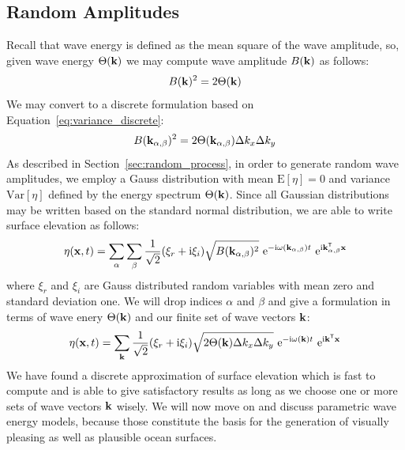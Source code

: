 \subsection{Random Amplitudes}
\label{sec:random_amplitudes}
Recall that wave energy is defined as the mean square of the wave amplitude, so,
given wave energy $\Theta(\mathbf{k})$ we may compute wave amplitude 
$B(\mathbf{k})$ as follows:
\begin{equation}
 B(\mathbf{k})^2 = 2\Theta(\mathbf{k})
\end{equation}
We may convert to a discrete formulation based on 
Equation~\ref{eq:variance_discrete}:
\begin{equation}
 B(\mathbf{k}_{\alpha,\beta})^2 = 2\Theta(\mathbf{k}_{\alpha,\beta})\Delta k_x 
\Delta k_y
\end{equation}
As described in Section~\ref{sec:random_process}, in order to generate random 
wave amplitudes, we employ a Gauss distribution with mean $\mathrm{E}[\eta] 
= 0$ and variance $\mathrm{Var}[\eta]$ defined by the energy spectrum
$\Theta(\mathbf{k})$. Since all Gaussian distributions may be written based on 
the standard normal distribution, we are able to write surface elevation as 
follows:
\begin{equation}
 \eta(\mathbf{x}, t) = 
\sum_{\alpha}\sum_{\beta}\frac{1}{\sqrt{2}}(\xi_r+\mathrm{i}\xi_i)\sqrt{B(\mathbf{
k}_{\alpha,\beta})^2}~\mathrm{e}^{-\mathrm{i}\omega(\mathbf{k}_{\alpha,\beta}) 
t}~\mathrm{e}^{\mathrm{i}\mathbf{k}_{\alpha,\beta}^{\mathsf{T}}\mathbf{x}}
\end{equation}
where $\xi_r$ and $\xi_i$ are Gauss distributed random variables with mean zero 
and standard deviation one. We will drop indices $\alpha$ and $\beta$ and give 
a formulation in terms of wave enery $\Theta(\mathbf{k})$ and our finite set of 
wave vectors $\mathbf{k}$:
\begin{equation}
\label{eq:surface_elevation_discrete}
 \eta(\mathbf{x}, t) = 
\sum_{\mathbf{k}}\frac{1}{\sqrt{2}}(\xi_r+\mathrm{i}\xi_i)
\sqrt{2\Theta(\mathbf{k})\Delta k_x \Delta k_y} 
~\mathrm{e}^{-\mathrm{i}\omega(\mathbf{k})t}
~\mathrm{e}^{\mathrm{i}\mathbf{k}^{\mathsf{T}}\mathbf{x}}
\end{equation}
%
We have found a discrete approximation of surface elevation which is fast to 
compute and is able to give satisfactory results as long as we choose one or 
more sets of wave vectors $\mathbf{k}$ wisely. We will now move on and discuss
parametric wave energy models, because those constitute the basis for the
generation of visually pleasing as well as plausible ocean surfaces.
%
